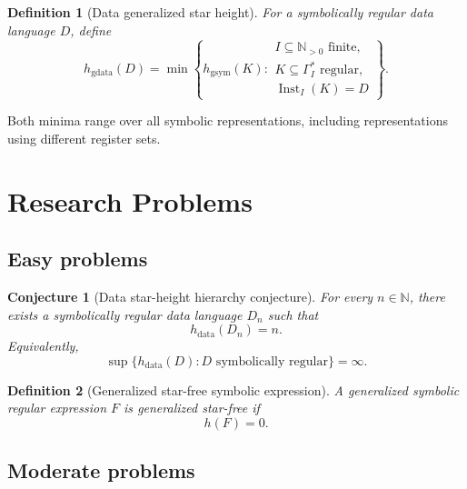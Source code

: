 \documentclass[11pt]{article}
\newtheorem{definition}{Definition}
\newtheorem{conjecture}{Conjecture}
\begin{document}
\begin{definition}[Data generalized star height]
For a symbolically regular data language $D$, define
\[
 h_{\mathrm{gdata}}(D)=
 \min\left\{
 h_{\mathrm{gsym}}(K):
 \begin{array}{l}
 I\subseteq\mathbb N_{>0}\text{ finite},\\
 K\subseteq\Gamma_I^*\text{ regular},\\
 \operatorname{Inst}_I(K)=D
 \end{array}
 \right\}.
\]
\end{definition}

Both minima range over all symbolic representations, including
representations using different register sets.

\section{Research Problems }

\subsection{Easy problems}

\begin{conjecture}[Data star-height hierarchy conjecture]
For every $n\in\mathbb N$, there exists a symbolically regular data language
$D_n$ such that
\[
 h_{\mathrm{data}}(D_n)=n.
\]
Equivalently,
\[
 \sup\{h_{\mathrm{data}}(D):D\text{ symbolically regular}\}=\infty.
\]
\end{conjecture}




\begin{definition}[Generalized star-free symbolic expression]
A generalized symbolic regular expression $F$ is
\emph{generalized star-free} if
\[
  h(F)=0.
\]
\end{definition}







\subsection{Moderate problems}
\end{document}
